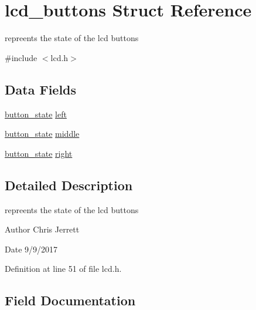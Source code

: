 \hypertarget{structlcd__buttons}{}\section{lcd\+\_\+buttons Struct Reference}
\label{structlcd__buttons}


repreents the state of the lcd buttons  




{\ttfamily \#include $<$lcd.\+h$>$}

\subsection*{Data Fields}
\begin{DoxyCompactItemize}
\item 
\hyperlink{lcd_8h_a0bbab92f5605e16a4162b6c5ccc2c29b}{button\+\_\+state} \hyperlink{structlcd__buttons_adf4426df10903d1dba0ee269473cb079}{left}
\item 
\hyperlink{lcd_8h_a0bbab92f5605e16a4162b6c5ccc2c29b}{button\+\_\+state} \hyperlink{structlcd__buttons_a682104bb266b516795b8533f269e0c74}{middle}
\item 
\hyperlink{lcd_8h_a0bbab92f5605e16a4162b6c5ccc2c29b}{button\+\_\+state} \hyperlink{structlcd__buttons_adfa688bb1cef42853f6eb2061f726e19}{right}
\end{DoxyCompactItemize}


\subsection{Detailed Description}
repreents the state of the lcd buttons 

\begin{DoxyAuthor}{Author}
Chris Jerrett 
\end{DoxyAuthor}
\begin{DoxyDate}{Date}
9/9/2017 
\end{DoxyDate}


Definition at line 51 of file lcd.\+h.



\subsection{Field Documentation}
\mbox{\label{structlcd__buttons_adf4426df10903d1dba0ee269473cb079}} 
